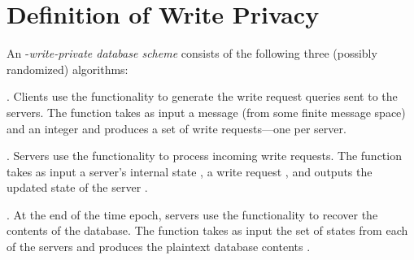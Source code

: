 \documentclass[10pt,twocolumn]{article}
\begin{document}
 


\frenchspacing


\nonfrenchspacing

\appendix
\section{Definition of Write Privacy}
\label{app:game}

An -{\em write-private database scheme}
consists of the following three (possibly randomized) algorithms: 

\medskip

\begin{hangparas}{0.25in}{1}
  .
  Clients use the  functionality to generate the
  write request queries sent to the  servers. 
  The  function takes as input a message  (from some 
  finite message space) and an integer  and produces a set of 
  write requests---one per server.
  
  .
  Servers use the  functionality to process incoming
  write requests.
  The  function takes as input a server's internal state
  , a write request , and outputs the updated state of the server .

  .
  At the end of the time epoch, servers use the  functionality
  to recover the contents of the database.
  The  function takes as input the set of states from
  each of the  servers and produces the plaintext database contents .
\end{hangparas}

\medskip
\end{document}
